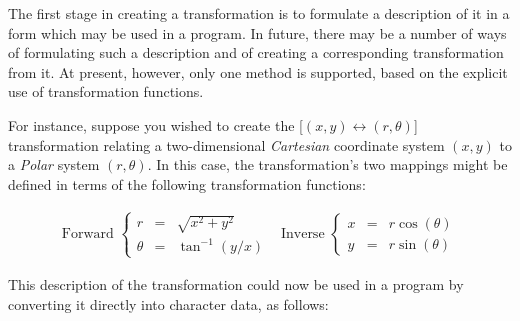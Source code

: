 \documentclass[twoside,11pt]{article}
\begin{document}
The first stage in creating a transformation is to formulate a description 
of it in a form which may be used in a program.
In future, there may be a number of ways of formulating such a description 
and of creating a corresponding transformation from it.
At present, however, only one method is supported, based on the explicit use
of transformation functions.

For instance, suppose you wished to create the \mbox{[$(x,y) \leftrightarrow
(r,\theta)$]} transformation relating a two-dimensional {\em Cartesian}
coordinate system \mbox{$(x,y)$} to a \emph{Polar} system
\mbox{$(r,\theta)$}. 
In this case, the transformation's two mappings might be defined in terms of
the following transformation functions: 

\begin{equation}
\begin{array}{cc}
\mbox{Forward } \left\{
\begin{array}{lll}
r & = & \sqrt{x^2+y^2} \\
\theta & = & \tan^{-1} \left( {y/x} \right)
\end{array}
\right.
&
\mbox{Inverse } \left\{
\begin{array}{lll}
x & = & r \cos( \theta ) \\
y & = & r \sin( \theta )
\end{array}
\right.
\end{array}
\label{equation:polar}
\end{equation}

This description of the transformation could now be used in a program by
converting it directly into character data, as follows: 
\end{document}
